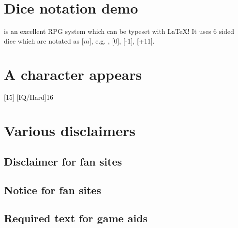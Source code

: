 \documentclass{article}
\begin{document}
\tableofcontents

\section{Dice notation demo}
\label{sec:dice-notation-demo}

\gurps is an excellent RPG system which can be typeset with \LaTeX{}! It uses 6
sided dice which are notated as [$m$], e.g. , [0], [-1], [+11].

\section{A character appears}
\label{sec:character-appears}

\begin{character}
  [15]
  [IQ/Hard]{16}
\end{character}


\section{Various disclaimers}
\label{sec:various-disclaimers}

\subsection{Disclaimer for fan sites}
\label{sec:disclaimer-fan-sites}

\SJGamesOnlinePolicyDisclaimer

\subsection{Notice for fan sites}
\label{sec:disclaimer-fan-sites}

\SJGamesOnlinePolicyNotice

\subsection{Required text for game aids}
\label{sec:disclaimer-fan-sites}

\end{document}
